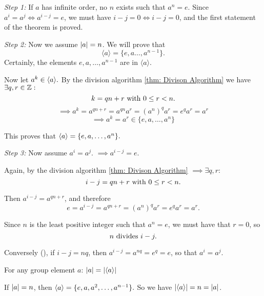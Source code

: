 \begin{prf}
  \emph{Step 1:} If $a$ has infinite order, no $n$ exists such that $a^n = e$. Since $a^i=a^j \iff a^{i-j} = e$, we must have $i-j=0 \iff i-j = 0$, and the first statement of the theorem is proved.

  \emph{Step 2:} Now we assume $\abs{a} = n$. We will prove that
  \begin{equation}
    \langle a \rangle = \{e, a \ldots, a^{n-1}\}.
  \end{equation}
  Certainly, the elements $e, a, \ldots, a^{n-1}$ are in $\langle a \rangle$.

  Now let $a^k \in \langle a \rangle.$ By the division algorithm \ref{thm: Divison Algorithm} we have $\exists q,r \in \mathbb{Z}:$
  \begin{equation}
    k=qn+r $ with $ 0 \leq r < n.
  \end{equation}
  \begin{equation}
    \implies a^k=a^{qn+r}=a^{qn}a^r = (a^{n})^q a^r = e^q a^r = a^r
  \end{equation}
  \begin{equation}
    \implies a^k=a^r\in \{e,a,\ldots,a^n\}
  \end{equation}

  This proves that $\langle a \rangle =  \{e,a,\ldots,a^n\}.$

  \emph{Step 3: } Now assume $a^i = a^j$. $\implies a^{i-j} = e$.

  Again, by the division algorithm \ref{thm: Divison Algorithm} $\implies \exists q,r:$
  \begin{equation}
    i-j = qn + r $ with $ 0 \leq r < n.
  \end{equation}

  Then $a^{i-j}=a^{qn+r}$, and therefore
  \begin{equation}
    e=a^{i-j} = a^{qn+r} = (a^n)^q a^r = e^q a^r = a^r.
  \end{equation}

  Since $n$ is the least positive integer such that $a^n = e$, we must have that $r=0$, so
  \begin{equation}
    n$ divides $i-j.
  \end{equation}

  Conversely (\qt{$\Leftarrow$}), if $i-j=nq$, then $a^{i-j} = a^{nq} =e^q =e$, so that $a^i = a^j$.
\end{prf}

\setcounter{corollary}{0}
\begin{corollary}
  \label{thm: the order of an elmenet of a group equals to the size of the group generated by this element}
  For any group element $a$:
  $\abs{a} = \abs{\langle a \rangle}$
\end{corollary}
\begin{prf}
  If $\abs{a} = n$, then $\langle a \rangle = \{e,a,a^2, \ldots, a^{n-1} \}.$ So we have $\abs{\langle a \rangle} = n = \abs{a}$.
\end{prf}

